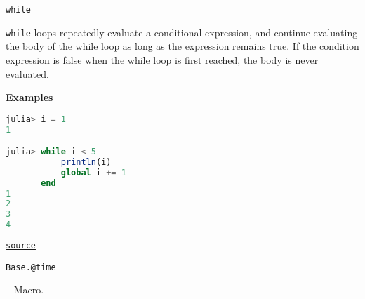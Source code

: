 \begin{adjustwidth}{2em}{0pt}


\begin{lstlisting}[]
while
\end{lstlisting}

\texttt{while} loops repeatedly evaluate a conditional expression, and continue evaluating the body of the while loop as long as the expression remains true. If the condition expression is false when the while loop is first reached, the body is never evaluated.

\textbf{Examples}


\begin{lstlisting}[language=julia, style=jlcodestyle]
julia> i = 1
1

julia> while i < 5
           println(i)
           global i += 1
       end
1
2
3
4
\end{lstlisting}



\href{https://github.com/JuliaLang/julia/blob/8e630552924eac54c809aa7bc30871c7df1582d3/base/docs/basedocs.jl#L928-L949}{\texttt{source}}


\end{adjustwidth}
\hypertarget{8029752041511656628}{\texttt{Base.@time}}  -- {Macro.}

